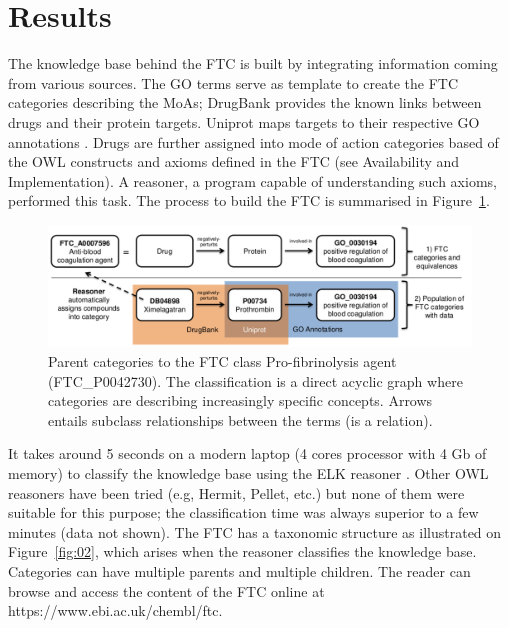 \documentclass{bioinfo}
\begin{document}
\section{Results}

The knowledge base behind the FTC is built by integrating information coming from various sources. 
The GO terms serve as template to create the FTC categories describing the MoAs; DrugBank \citep{Knox2011} provides the 
known links between drugs and their protein targets. Uniprot \citep{TheUniprotConsortium2013} maps targets to their 
respective GO annotations \citep{Dimmer2012}. 
Drugs are further assigned into mode of action categories based of the OWL constructs and axioms defined in the 
FTC (see Availability and Implementation). A reasoner, a program capable of understanding such axioms, performed this task. 
The process to build the FTC is summarised in Figure~\ref{fig:01}.

\begin{figure}[!tpb]%
\centerline{\includegraphics{fig1.png}}
\caption{Parent categories to the FTC class Pro-fibrinolysis agent (FTC\_P0042730). The classification is a direct 
acyclic graph where categories are describing increasingly specific concepts. Arrows entails subclass relationships 
between the terms (is a relation).}\label{fig:01}
\end{figure}

It takes around 5 seconds on a modern 
laptop (4 cores processor with 4 Gb of memory) to classify the knowledge base using the ELK reasoner \citep{Kazakov2011}. 
Other OWL reasoners have been tried (e.g, Hermit, Pellet, etc.) but none of them were suitable for this purpose; 
the classification time was always superior to a few minutes (data not shown). The FTC has a taxonomic structure as illustrated 
on Figure~\ref{fig:02}, which arises when the reasoner classifies the knowledge base. Categories can have multiple parents and multiple children. 
The reader can browse and access the content of the FTC online at {{https://www.ebi.ac.uk/chembl/ftc}}.
\end{document}
